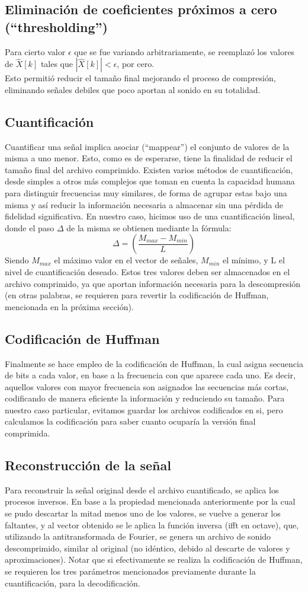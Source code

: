 \documentclass[a4paper,11pt]{article}
\begin{document}
\subsection{Eliminación de coeficientes próximos a cero (``thresholding'')}
Para cierto valor $\epsilon$ que se fue variando arbitrariamente, se reemplazó
los valores de $\hat{X}[k]$ tales que $|\hat{X}[k]| < \epsilon$, por cero. \\
Esto permitió reducir el tamaño final mejorando el proceso de compresión,
eliminando señales debiles que poco aportan al sonido en su totalidad.
\subsection{Cuantificación}
Cuantificar una señal implica asociar (``mappear'') el conjunto de valores de la
misma a uno menor. Esto, como es de esperarse, tiene la finalidad de
reducir el tamaño final del archivo comprimido. Existen varios métodos de
cuantificación, desde simples a otros más complejos que toman en cuenta la
capacidad humana para distinguir frecuencias muy similares, de forma de agrupar
estas bajo una misma y así reducir la información necesaria a almacenar sin una
pérdida de fidelidad significativa. En nuestro caso, hicimos uso de una
cuantificación lineal, donde el paso $\Delta$ de la misma se obtienen
mediante la fórmula:
$$\Delta = \left(\frac{M_{max} - M_{min}}{L}\right)$$
Siendo $M_{max}$ el máximo valor en el vector de señales, $M_{min}$ el mínimo,
y L el nivel de cuantificación deseado.
Estos tres valores deben ser almacenados en el archivo comprimido, ya que
aportan información necesaria para la descompresión (en otras palabras, se
requieren para revertir la codificación de Huffman, mencionada en la próxima
sección).
\subsection{Codificación de Huffman}
Finalmente se hace empleo de la codificación de Huffman, la cual asigna
secuencia de bits a cada valor, en base a la frecuencia con que aparece cada
uno. Es decir, aquellos valores con mayor frecuencia son asignados las
secuencias más cortas, codificando de manera eficiente la información y
reduciendo su tamaño.
Para nuestro caso particular, evitamos guardar los archivos codificados en si,
pero calculamos la codificación para saber cuanto ocuparía la versión final
comprimida.
\subsection{Reconstrucción de la señal}
Para reconstruir la señal original desde el archivo cuantificado, se aplica los
procesos inversos. En base a la propiedad mencionada anteriormente por la cual
se pudo descartar la mitad menos uno de los valores, se vuelve a generar los
faltantes, y al vector obtenido se le aplica la función inversa (ifft en
octave), que, utilizando la antitransformada de Fourier, se genera un archivo
de sonido descomprimido, similar al original (no idéntico, debido al descarte de
valores y aproximaciones). Notar que si efectivamente se realiza la
codificación de Huffman, se requieren los tres parámetros mencionados
previamente durante la cuantificación, para la decodificación.
\end{document}

